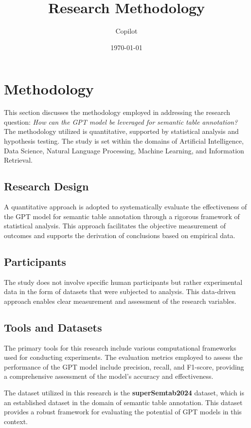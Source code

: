 \documentclass{article}
\title{Research Methodology}
\author{Copilot}
\date{\today}
\begin{document}
\maketitle

\section{Methodology}

This section discusses the methodology employed in addressing the research question: \textit{How can the GPT model be leveraged for semantic table annotation?} The methodology utilized is quantitative, supported by statistical analysis and hypothesis testing. The study is set within the domains of Artificial Intelligence, Data Science, Natural Language Processing, Machine Learning, and Information Retrieval.

\subsection{Research Design}

A quantitative approach is adopted to systematically evaluate the effectiveness of the GPT model for semantic table annotation through a rigorous framework of statistical analysis. This approach facilitates the objective measurement of outcomes and supports the derivation of conclusions based on empirical data.

\subsection{Participants}

The study does not involve specific human participants but rather experimental data in the form of datasets that were subjected to analysis. This data-driven approach enables clear measurement and assessment of the research variables.

\subsection{Tools and Datasets}

The primary tools for this research include various computational frameworks used for conducting experiments. The evaluation metrics employed to assess the performance of the GPT model include precision, recall, and F1-score, providing a comprehensive assessment of the model's accuracy and effectiveness.

The dataset utilized in this research is the \textbf{superSemtab2024} dataset, which is an established dataset in the domain of semantic table annotation. This dataset provides a robust framework for evaluating the potential of GPT models in this context.
\end{document}
